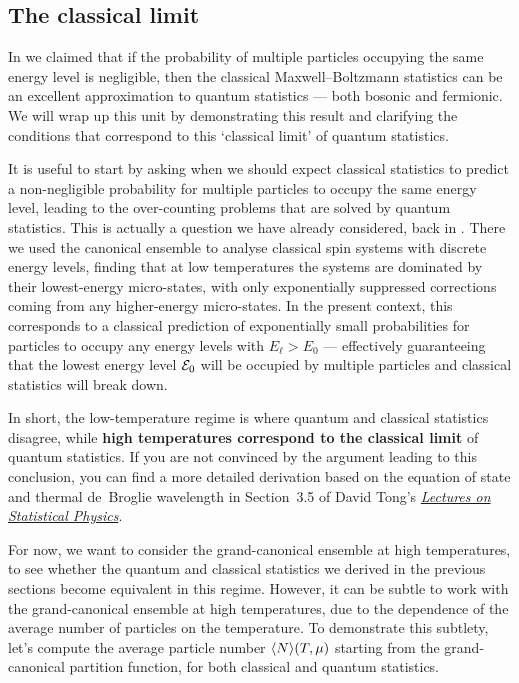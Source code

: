 \subsection{\label{sec:quantum_classical}The classical limit}
In  we claimed that if the probability of multiple particles occupying the same energy level is negligible, then the classical Maxwell--Boltzmann statistics can be an excellent approximation to quantum statistics --- both bosonic and fermionic.
We will wrap up this unit by demonstrating this result and clarifying the conditions that correspond to this `classical limit' of quantum statistics.

It is useful to start by asking when we should expect classical statistics to predict a non-negligible probability for multiple particles to occupy the same energy level, leading to the over-counting problems that are solved by quantum statistics.
This is actually a question we have already considered, back in .
There we used the canonical ensemble to analyse classical spin systems with discrete energy levels, finding that at low temperatures the systems are dominated by their lowest-energy micro-states, with only exponentially suppressed corrections coming from any higher-energy micro-states.
In the present context, this corresponds to a classical prediction of exponentially small probabilities for particles to occupy any energy levels with $E_{\ell} > E_0$ --- effectively guaranteeing that the lowest energy level $\mathcal E_0$ will be occupied by multiple particles and classical statistics will break down.

In short, the low-temperature regime is where quantum and classical statistics disagree, while \textbf{high temperatures correspond to the classical limit} of quantum statistics.
If you are not convinced by the argument leading to this conclusion, you can find a more detailed derivation based on the equation of state and thermal de~Broglie wavelength in Section~3.5 of David Tong's \href{https://www.damtp.cam.ac.uk/user/tong/statphys.html}{\textit{Lectures on Statistical Physics}}.

For now, we want to consider the grand-canonical ensemble at high temperatures, to see whether the quantum and classical statistics we derived in the previous sections become equivalent in this regime.
However, it can be subtle to work with the grand-canonical ensemble at high temperatures, due to the dependence of the average number of particles on the temperature.
To demonstrate this subtlety, let's compute the average particle number $\left\langle N \right\rangle\!(T, \mu)$ starting from the grand-canonical partition function, for both classical and quantum statistics.

